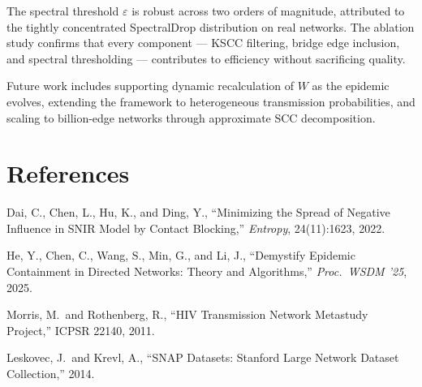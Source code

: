 \documentclass[conference]{IEEEtran}
\begin{document}
The spectral threshold $\varepsilon$ is robust across two orders of magnitude, attributed to the tightly concentrated SpectralDrop distribution on real networks. The ablation study confirms that every component --- KSCC filtering, bridge edge inclusion, and spectral thresholding --- contributes to efficiency without sacrificing quality.

Future work includes supporting dynamic recalculation of $W$ as the epidemic evolves, extending the framework to heterogeneous transmission probabilities, and scaling to billion-edge networks through approximate SCC decomposition.

\section*{References}

\noindent [1] Dai, C., Chen, L., Hu, K., and Ding, Y., ``Minimizing the Spread of Negative Influence in SNIR Model by Contact Blocking,'' \textit{Entropy}, 24(11):1623, 2022.

\noindent [2] He, Y., Chen, C., Wang, S., Min, G., and Li, J., ``Demystify Epidemic Containment in Directed Networks: Theory and Algorithms,'' \textit{Proc.\ WSDM '25}, 2025.

\noindent [3] Morris, M.\ and Rothenberg, R., ``HIV Transmission Network Metastudy Project,'' ICPSR 22140, 2011.

\noindent [4] Leskovec, J.\ and Krevl, A., ``SNAP Datasets: Stanford Large Network Dataset Collection,'' 2014.
\end{document}
